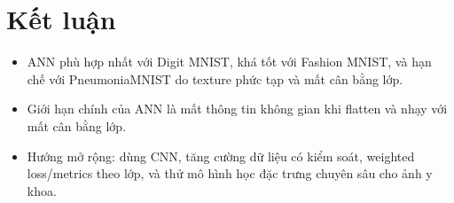 \documentclass[a4paper,12pt]{report}
\begin{document}
\section{Kết luận}
\begin{itemize}
    \item ANN phù hợp nhất với Digit MNIST, khá tốt với Fashion MNIST, và hạn chế với PneumoniaMNIST do texture phức tạp và mất cân bằng lớp.
    \item Giới hạn chính của ANN là mất thông tin không gian khi flatten và nhạy với mất cân bằng lớp.
    \item Hướng mở rộng: dùng CNN, tăng cường dữ liệu có kiểm soát, weighted loss/metrics theo lớp, và thử mô hình học đặc trưng chuyên sâu cho ảnh y khoa.
\end{itemize}
\end{document}
